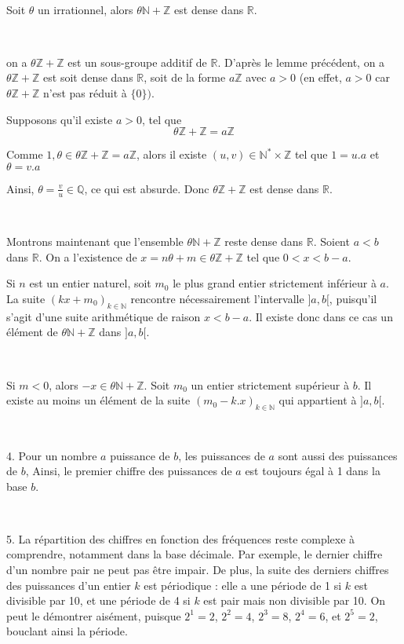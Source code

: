 \


Soit $\theta$ un irrationnel, alors $\theta \mathbb{N}+\mathbb{Z}$ est dense
dans $\mathbb{R}$.

\


on a $\theta \mathbb{Z}+\mathbb{Z}$ est un sous-groupe additif de
$\mathbb{R}$. D'apr{\`e}s le lemme pr{\'e}c{\'e}dent, on a $\theta
\mathbb{Z}+\mathbb{Z}$ est soit dense dans $\mathbb{R}$, soit de la forme
$a\mathbb{Z}$ avec $a > 0$ (en effet, $a > 0$ car $\theta
\mathbb{Z}+\mathbb{Z}$ n'est pas r{\'e}duit {\`a} $\{0\})$.

Supposons qu'il existe $a > 0$, tel que
\[ \theta \mathbb{Z}+\mathbb{Z}= a\mathbb{Z} \]


Comme $1, \theta \in \theta \mathbb{Z}+\mathbb{Z}= a\mathbb{Z}$, alors il
existe $(u, v) \in \mathbb{N}^{\ast} \times \mathbb{Z}$ tel que $1 = u.a$ et
$\theta = v.a$

Ainsi, $\theta = \frac{v}{u} \in \mathbb{Q}$, ce qui est absurde. Donc $\theta
\mathbb{Z}+\mathbb{Z}$ est dense dans $\mathbb{R}$.

\

Montrons maintenant que l'ensemble $\theta \mathbb{N}+\mathbb{Z}$ reste dense
dans $\mathbb{R}$. Soient $a < b$ dans $\mathbb{R}$. On a l'existence de $x =
n \theta + m \in \theta \mathbb{Z}+\mathbb{Z}$ tel que $0 < x < b - a$.

Si $n$ est un entier naturel, soit $m_0$ le plus grand entier strictement
inf{\'e}rieur {\`a} $a$. La suite $(kx + m_0)_{k \in \mathbb{N}}$ rencontre
n{\'e}cessairement l'intervalle $] a, b [$, puisqu'il s'agit d'une suite
arithm{\'e}tique de raison $x < b - a$. Il existe donc dans ce cas un
{\'e}l{\'e}ment de $\theta \mathbb{N}+\mathbb{Z}$ dans $] a, b [$.

\

Si $m < 0$, alors $- x \in \theta \mathbb{N}+\mathbb{Z}$. Soit $m_0$ un
entier strictement sup{\'e}rieur {\`a} $b$. Il existe au moins un
{\'e}l{\'e}ment de la suite $(m_0 - k.x)_{k \in \mathbb{N}}$ qui appartient
{\`a} $] a, b [$.

\

4. Pour un nombre $a$ puissance de $b$, les puissances de $a$ sont aussi des
puissances de $b$, Ainsi, le premier chiffre des puissances de $a$ est
toujours {\'e}gal {\`a} 1 dans la base $b$.

\

5. La r{\'e}partition des chiffres en fonction des fr{\'e}quences reste
complexe {\`a} comprendre, notamment dans la base d{\'e}cimale. Par exemple,
le dernier chiffre d'un nombre pair ne peut pas {\^e}tre impair. De plus, la
suite des derniers chiffres des puissances d'un entier $k$ est p{\'e}riodique
: elle a une p{\'e}riode de 1 si $k$ est divisible par 10, et une p{\'e}riode
de 4 si $k$ est pair mais non divisible par 10. On peut le d{\'e}montrer
ais{\'e}ment, puisque $2^1 = 2$, $2^2 = 4$, $2^3 = 8$, $2^4 = 6$, et $2^5 =
2$, bouclant ainsi la p{\'e}riode.

